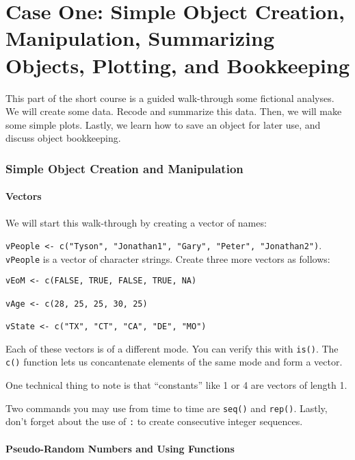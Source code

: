 \part{Case One: Simple Object Creation, Manipulation, Summarizing
  Objects, Plotting, and Bookkeeping}

This part of the short course is a guided walk-through some fictional
analyses. We will create some data. Recode and summarize this
data. Then, we will make some simple plots. Lastly, we learn how to
save an \R{} object for later use, and discuss object bookkeeping.

\section{Simple Object Creation and Manipulation}
\subsection{Vectors}
We will start this walk-through by creating a vector of names:

\verb=vPeople <- c("Tyson", "Jonathan1", "Gary", "Peter", "Jonathan2")=. 
\texttt{vPeople} is a vector of character strings. Create three more 
vectors as follows:
\begin{verbatim}
vEoM <- c(FALSE, TRUE, FALSE, TRUE, NA)

vAge <- c(28, 25, 25, 30, 25)

vState <- c("TX", "CT", "CA", "DE", "MO")
\end{verbatim}
Each of these vectors is of a different mode. You can verify this with
\texttt{is()}. The \texttt{c()} function lets us concantenate elements
of the same mode and form a vector.

One technical thing to note is that ``constants'' like 1 or 4 are
vectors of length 1.

Two commands you may use from time to time are \texttt{seq()} and
\texttt{rep()}. Lastly, don't forget about the use of \texttt{:} to
create consecutive integer sequences.

\subsection{Pseudo-Random Numbers and Using Functions}


